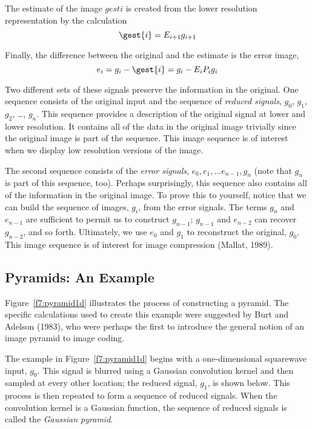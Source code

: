 The estimate of the image $gest{i}$ is created from the lower resolution
representation by the calculation
\begin{equation}
\label{e7:interpolated}
\gest{i} = E_{i+1} g_{i+1}
\end{equation}

Finally, the difference between the original and the
estimate is the error image,
\begin{equation}
\label{e7:error}
e_i = g_i -  \gest{i} = g_i - E_i {P_i} g_i 
\end{equation}

Two different sets of these signals preserve the information in
the original.  One sequence consists of the original input and the
sequence of {\em reduced signals}, $g_0$, $g_1$, $g_2$, \ldots ,
$g_n$.  This sequence provides a description of the original signal at
lower and lower resolution.  It contains all of the data in the
original image trivially since the original image is part of the
sequence.  This image sequence is of interest when we display low
resolution versions of the image.

The second sequence consists of the {\em error signals}, $e_0, e_1, \ldots
e_{n-1}, g_n$ (note that $g_n$ is part of this sequence, too).
Perhaps surprisingly, this sequence also contains all of the
information in the original image.  To prove this to yourself, notice
that we can build the sequence of images, $g_i$, from the error
signals.  The terms $g_n$ and $e_{n-1}$ are sufficient to permit us to
construct $g_{n-1}$; $g_{n-1}$ and $e_{n-2}$ can recover $g_{n-2}$,
and so forth.  Ultimately, we use $e_0$ and $g_1$ to reconstruct the
original, $g_0$.  This image sequence is of interest for image
compression (Mallat, 1989).

\subsection*{Pyramids:  An Example}
Figure~\ref{f7:pyramid1d} illustrates the process of constructing a
pyramid.  The specific calculations used to create this example were
suggested by Burt and Adelson (1983), who were perhaps the first to
introduce the general notion of an image pyramid to image coding.

The example in Figure~\ref{f7:pyramid1d} begins with a one-dimensional
squarewave input, $g_0$.  This signal is blurred using a Gaussian
convolution kernel and then sampled at every other location; the
reduced signal, $g_1$, is shown below.  
This process is then repeated to form a sequence of reduced signals.
When the convolution kernel is
a Gaussian function, the sequence of reduced signals is called the
{\em Gaussian pyramid}.

